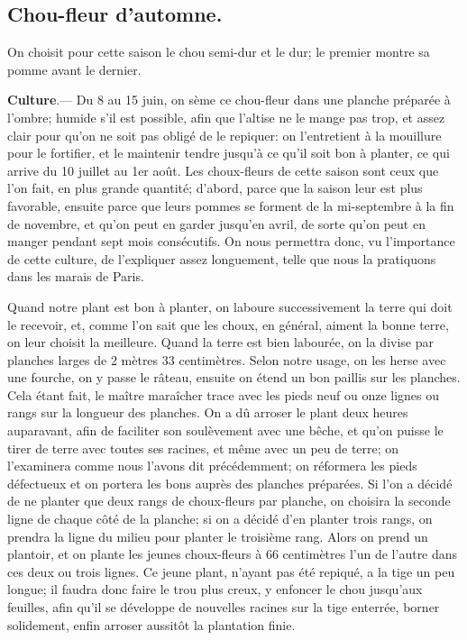 \documentclass[10pt,a4paper]{book}
\begin{document}
\subsection{Chou-fleur d'automne.}

On choisit pour cette saison le chou semi-dur et le dur; le premier montre sa pomme avant le dernier.

\textbf{Culture}.--- Du 8 au 15 juin, on sème ce chou-fleur dans une planche préparée à l'ombre; humide s'il est possible, afin que l'altise ne le mange pas trop, et assez clair pour qu'on ne soit pas obligé de le repiquer: on l'entretient à la mouillure pour le fortifier, et le maintenir tendre jusqu'à ce qu'il soit bon à planter, ce qui arrive du 10 juillet au 1er août. Les choux-fleurs de cette saison sont ceux que l'on fait, en plus grande quantité; d'abord, parce que la saison leur est plus favorable, ensuite parce que leurs pommes se forment de la mi-septembre à la fin de novembre, et qu'on peut en garder jusqu'en avril, de sorte qu'on peut en manger pendant sept mois consécutifs. On nous permettra donc, vu l'importance de cette culture, de l'expliquer assez longuement, telle que nous la pratiquons dans les marais de Paris.

Quand notre plant est bon à planter, on laboure successivement la terre qui doit le recevoir, et, comme l'on sait que les choux, en général, aiment la bonne terre, on leur choisit la meilleure. Quand la terre est bien labourée, on la divise par planches larges de 2 mètres 33 centimètres. Selon notre usage, on les herse avec une fourche, on y passe le râteau, ensuite on étend un bon paillis sur les planches. Cela étant fait, le maître maraîcher trace avec les pieds neuf ou onze lignes ou rangs sur la longueur des planches. On a dû arroser le plant deux heures auparavant, afin de faciliter son soulèvement avec une bêche, et qu'on puisse le tirer de terre avec toutes ses racines, et même avec un peu de terre; on l'examinera comme nous l'avons dit précédemment; on réformera les pieds défectueux et on portera les bons auprès des planches préparées. Si l'on a décidé de ne planter que deux rangs de choux-fleurs par planche, on choisira la seconde ligne de chaque côté de la planche; si on a décidé d'en planter trois rangs, on prendra la ligne du milieu pour planter le troisième rang. Alors on prend un plantoir, et on plante les jeunes choux-fleurs à 66 centimètres l'un de l'autre dans ces deux ou trois lignes. Ce jeune plant, n'ayant pas été repiqué, a la tige un peu longue; il faudra donc faire le trou plus creux, y enfoncer le chou jusqu'aux feuilles, afin qu'il se développe de nouvelles racines sur la tige enterrée, borner solidement, enfin arroser aussitôt la plantation finie.
\end{document}
